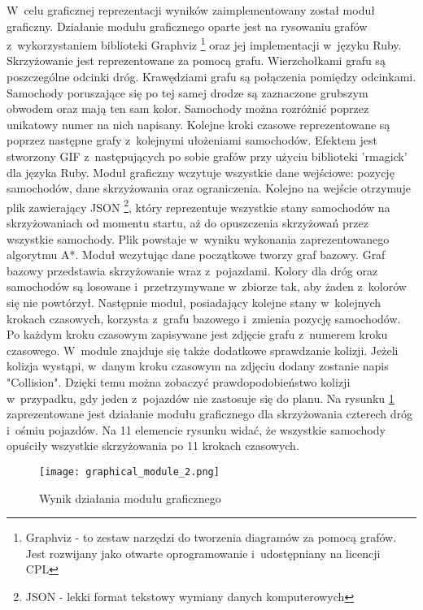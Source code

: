 W~celu graficznej reprezentacji wyników zaimplementowany został moduł graficzny. Działanie modułu graficznego oparte jest na rysowaniu grafów z~wykorzystaniem biblioteki Graphviz \footnote{Graphviz - to zestaw narzędzi do tworzenia diagramów za pomocą grafów. Jest rozwijany jako otwarte oprogramowanie i~udostępniany na licencji CPL} oraz jej implementacji w~języku Ruby. Skrzyżowanie jest reprezentowane za pomocą grafu. Wierzchołkami grafu są poszczególne odcinki dróg. Krawędziami grafu są połączenia pomiędzy odcinkami. Samochody poruszające się po tej samej drodze są zaznaczone grubszym obwodem oraz mają ten sam kolor. Samochody można rozróżnić poprzez unikatowy numer na nich napisany. Kolejne kroki czasowe reprezentowane są poprzez następne grafy z~kolejnymi ułożeniami samochodów. Efektem jest stworzony GIF z~następujących po sobie grafów przy użyciu biblioteki 'rmagick' dla języka Ruby.
\newline
\indent
Moduł graficzny wczytuje wszystkie dane wejściowe: pozycję samochodów, dane skrzyżowania oraz ograniczenia. Kolejno na wejście otrzymuje plik zawierający JSON \footnote{JSON - lekki format tekstowy wymiany danych komputerowych}, który reprezentuje wszystkie stany samochodów na skrzyżowaniach od momentu startu, aż do opuszczenia skrzyżowań przez wszystkie samochody. Plik powstaje w~wyniku wykonania zaprezentowanego algorytmu A*. Moduł wczytując dane początkowe tworzy graf bazowy. Graf bazowy przedstawia skrzyżowanie wraz z~pojazdami. Kolory dla dróg oraz samochodów są losowane i~przetrzymywane w~zbiorze tak, aby żaden z~kolorów się nie powtórzył. Następnie moduł, posiadający kolejne stany w~kolejnych krokach czasowych, korzysta z~grafu bazowego i~zmienia pozycję samochodów. Po każdym kroku czasowym zapisywane jest zdjęcie grafu z~numerem kroku czasowego.
\newline
\indent
W~module znajduje się także dodatkowe sprawdzanie kolizji. Jeżeli kolizja wystąpi, w~danym kroku czasowym na zdjęciu dodany zostanie napis "Collision". Dzięki temu można zobaczyć prawdopodobieństwo kolizji w~przypadku, gdy jeden z~pojazdów nie zastosuje się do planu.
\newline
\indent
Na rysunku \ref{graphical-framework} zaprezentowane jest działanie modułu graficznego dla skrzyżowania czterech dróg i~ośmiu pojazdów. Na 11 elemencie rysunku widać, że wszystkie samochody opuściły wszystkie skrzyżowania po 11 krokach czasowych.
\begin{figure}[H]
    \texttt{[image: graphical\_module\_2.png]}
  \caption{Wynik działania modułu graficznego}
  \label{graphical-framework}
\end{figure}
\newpage
